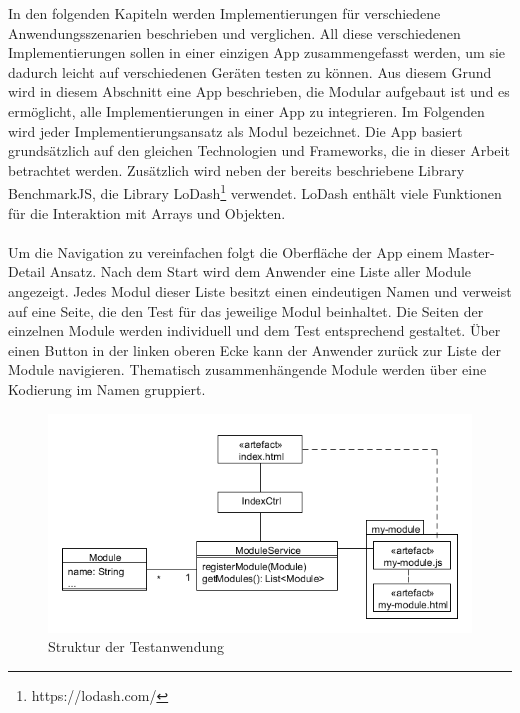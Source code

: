 
In den folgenden Kapiteln werden Implementierungen für verschiedene Anwendungsszenarien beschrieben und verglichen. All diese verschiedenen Implementierungen sollen in einer einzigen App zusammengefasst werden, um sie dadurch leicht auf verschiedenen Geräten testen zu können. Aus diesem Grund wird in diesem Abschnitt eine App beschrieben, die Modular aufgebaut ist und es ermöglicht, alle Implementierungen in einer App zu integrieren. Im Folgenden wird jeder Implementierungsansatz als Modul bezeichnet. Die App basiert grundsätzlich auf den gleichen Technologien und Frameworks, die in dieser Arbeit betrachtet werden. Zusätzlich wird neben der bereits beschriebene Library BenchmarkJS, die Library LoDash\footnote{https://lodash.com/} verwendet. LoDash enthält viele Funktionen für die Interaktion mit Arrays und Objekten.
\\\\
Um die Navigation zu vereinfachen folgt die Oberfläche der App einem Master-Detail Ansatz. Nach dem Start wird dem Anwender eine Liste aller Module angezeigt. Jedes Modul dieser Liste besitzt einen eindeutigen Namen und verweist auf eine Seite, die den Test für das jeweilige Modul beinhaltet. Die Seiten der einzelnen Module werden individuell und dem Test entsprechend gestaltet. Über einen Button in der linken oberen Ecke kann der Anwender zurück zur Liste der Module navigieren. Thematisch zusammenhängende Module werden über eine Kodierung im Namen gruppiert.  
\begin{figure}
	\centering
	\includegraphics[scale=0.6]{Bilder/Testanwendung.png}
	\caption{Struktur der Testanwendung}
	\label{struktur-testanwendung}
\end{figure}
